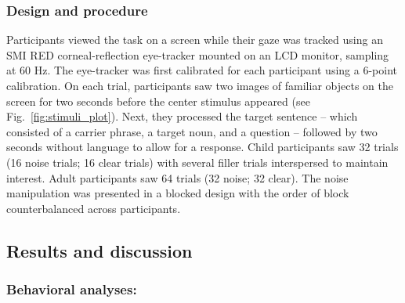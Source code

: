 \documentclass[english,floatsintext,man]{apa6}
\theoremstyle{definition}
\theoremstyle{definition}
\theoremstyle{definition}
\theoremstyle{remark}
\begin{document}
\hypertarget{design-and-procedure-2}{%
\subsubsection{Design and procedure}\label{design-and-procedure-2}}

Participants viewed the task on a screen while their gaze was tracked
using an SMI RED corneal-reflection eye-tracker mounted on an LCD
monitor, sampling at 60 Hz. The eye-tracker was first calibrated for
each participant using a 6-point calibration. On each trial,
participants saw two images of familiar objects on the screen for two
seconds before the center stimulus appeared (see
Fig.~\ref{fig:stimuli_plot}). Next, they processed the target sentence
-- which consisted of a carrier phrase, a target noun, and a question --
followed by two seconds without language to allow for a response. Child
participants saw 32 trials (16 noise trials; 16 clear trials) with
several filler trials interspersed to maintain interest. Adult
participants saw 64 trials (32 noise; 32 clear). The noise manipulation
was presented in a blocked design with the order of block
counterbalanced across participants.

\hypertarget{results-and-discussion-2}{%
\subsection{Results and discussion}\label{results-and-discussion-2}}

\hypertarget{behavioral-analyses-2}{%
\subsubsection{Behavioral analyses:}\label{behavioral-analyses-2}}
\end{document}
